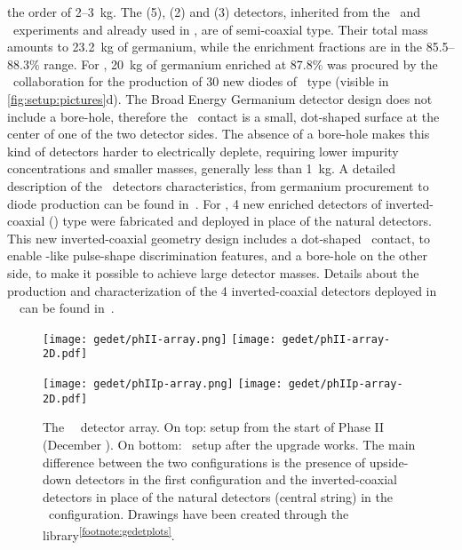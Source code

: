 the order of 2--3~kg. The \ANG{} (5), \RG{} (2) and \GTF{} (3) detectors, inherited from
the \hdm\ and \igex\ experiments and already used in \phaseone, are of semi-coaxial type.
Their total mass amounts to 23.2~kg of germanium, while the enrichment fractions are in
the 85.5--88.3\% range. For \phasetwo, 20~kg of germanium enriched at 87.8\% was procured
by the \gerda\ collaboration for the production of 30 new diodes of \bege\ type (visible
in \cref{fig:setup:pictures}d). The Broad Energy Germanium detector design does not
include a bore-hole, therefore the \pplus\ contact is a small, dot-shaped surface at the
center of one of the two detector sides. The absence of a bore-hole makes this kind of
detectors harder to electrically deplete, requiring lower impurity concentrations and
smaller masses, generally less than 1~kg. A detailed description of the \bege\ detectors
characteristics, from germanium procurement to diode production can be found
in~\cite{Agostini2015e, Agostini2018a, Agostini2019}. For \phasetwop, 4 new enriched \IC{}
detectors of inverted-coaxial (\icoax) type were fabricated and deployed in place of the
natural \GTF{} detectors. This new inverted-coaxial geometry design includes a dot-shaped
\pplus\ contact, to enable \bege-like pulse-shape discrimination features, and a bore-hole
on the other side, to make it possible to achieve large detector masses.  Details about
the production and characterization of the 4 inverted-coaxial detectors deployed in
\gerda\ \phasetwop\ can be found in~\cite{Miloradovic2020, Agostini2021b}.

\begin{figure}
  \centering
  \texttt{[image: gedet/phII-array.png]}%
  \hspace{0.5cm}%
  \texttt{[image: gedet/phII-array-2D.pdf]}
  \vspace{0.5cm}

  \texttt{[image: gedet/phIIp-array.png]}%
  \hspace{0.5cm}%
  \texttt{[image: gedet/phIIp-array-2D.pdf]}
  \caption[placeholder]{%
    The \gerda\ \phasetwo\ detector array. On top: setup from the start of Phase II
    (December ). On bottom: \phasetwop\ setup after the  upgrade works.
    The main difference between the two configurations is the presence of upside-down
    detectors in the first configuration and the inverted-coaxial detectors in place of
    the natural detectors (central string) in the \phasetwop\ configuration. Drawings have
    been created through the 
    library\textsuperscript{\ref{footnote:gedetplots}}.
  }\label{fig:setup:array}
\end{figure}

